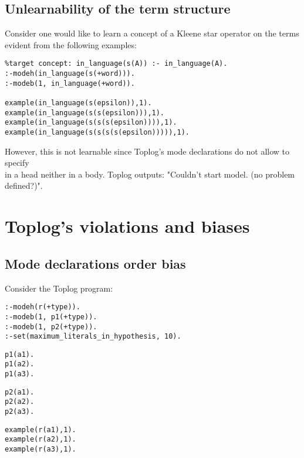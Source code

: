 \subsection{Unlearnability of the term structure}
Consider one would like to learn a concept of a Kleene star operator on the terms evident from the following examples:
\begin{lstlisting}
%target concept: in_language(s(A)) :- in_language(A).
:-modeh(in_language(s(+word))).
:-modeb(1, in_language(+word)).

example(in_language(s(epsilon)),1).
example(in_language(s(s(epsilon))),1).
example(in_language(s(s(s(epsilon)))),1).
example(in_language(s(s(s(s(epsilon))))),1).
\end{lstlisting}

However, this is not learnable since Toplog's mode declarations do not allow to specify\\
 in a head neither in a body. Toplog outputs:
"Couldn't start model. (no problem defined?)".


\section{Toplog's violations and biases}
\subsection{Mode declarations order bias}
Consider the Toplog program:

\begin{minipage}[t]{.35\textwidth}
\begin{lstlisting}
:-modeh(r(+type)).
:-modeb(1, p1(+type)).
:-modeb(1, p2(+type)).
:-set(maximum_literals_in_hypothesis, 10).
\end{lstlisting}
\end{minipage}
\begin{minipage}[t]{.20\textwidth}
\begin{lstlisting}
p1(a1).
p1(a2).
p1(a3).
\end{lstlisting}
\end{minipage}
\begin{minipage}[t]{.20\textwidth}
\begin{lstlisting}
p2(a1).
p2(a2).
p2(a3).
\end{lstlisting}
\end{minipage}
\begin{minipage}[t]{.25\textwidth}
\begin{lstlisting}
example(r(a1),1).
example(r(a2),1).
example(r(a3),1).
\end{lstlisting}
\end{minipage}


